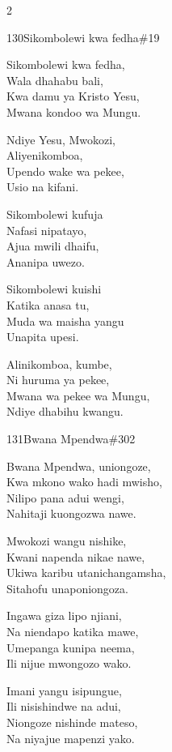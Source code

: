 \documentclass{article}
\begin{document}
\begin{multicols}{2}
\begin{hymn}{130}{Sikombolewi kwa fedha}{\#19}
\begin{stanza}
Sikombolewi kwa fedha,\\
Wala dhahabu bali,\\
Kwa damu ya Kristo Yesu,\\
Mwana kondoo wa Mungu.
\end{stanza}
\begin{chorus}
Ndiye Yesu, Mwokozi,\\
Aliyenikomboa,\\
Upendo wake wa pekee,\\
Usio na kifani.
\end{chorus}
\begin{stanza}
Sikombolewi kufuja\\
Nafasi nipatayo,\\
Ajua mwili dhaifu,\\
Ananipa uwezo.
\end{stanza}
\begin{stanza}
Sikombolewi kuishi\\
Katika anasa tu,\\
Muda wa maisha yangu\\
Unapita upesi.
\end{stanza}
\begin{stanza}
Alinikomboa, kumbe,\\
Ni huruma ya pekee,\\
Mwana wa pekee wa Mungu,\\
Ndiye dhabihu kwangu.
\end{stanza}
\end{hymn}

\begin{hymn}{131}{Bwana Mpendwa}{\#302}
\begin{stanza}
Bwana Mpendwa, uniongoze,\\
Kwa mkono wako hadi mwisho,\\
Nilipo pana adui wengi,\\
Nahitaji kuongozwa nawe.
\end{stanza}
\begin{chorus}
Mwokozi wangu nishike,\\
Kwani napenda nikae nawe,\\
Ukiwa karibu utanichangamsha,\\
Sitahofu unaponiongoza.
\end{chorus}
\begin{stanza}
Ingawa giza lipo njiani,\\
Na niendapo katika mawe,\\
Umepanga kunipa neema,\\
Ili nijue mwongozo wako.
\end{stanza}
\begin{stanza}
Imani yangu isipungue,\\
Ili nisishindwe na adui,\\
Niongoze nishinde mateso,\\
Na niyajue mapenzi yako.
\end{stanza}
\end{hymn}


\end{multicols}
\end{document}
